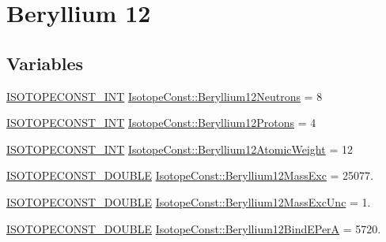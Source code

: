 \hypertarget{group___isotope_const-_beryllium-_be12}{}\section{Beryllium 12}
\label{group___isotope_const-_beryllium-_be12}
\subsection*{Variables}
\begin{DoxyCompactItemize}
\item 
\mbox{\hyperlink{group___isotope_const-_macros_ga5f18360b3e99483a35c32d789e62621c}{I\+S\+O\+T\+O\+P\+E\+C\+O\+N\+S\+T\+\_\+\+I\+NT}} \mbox{\hyperlink{group___isotope_const-_beryllium-_be12_ga2284ea64341a2060eadc0064400bceb4}{Isotope\+Const\+::\+Beryllium12\+Neutrons}} = 8
\item 
\mbox{\hyperlink{group___isotope_const-_macros_ga5f18360b3e99483a35c32d789e62621c}{I\+S\+O\+T\+O\+P\+E\+C\+O\+N\+S\+T\+\_\+\+I\+NT}} \mbox{\hyperlink{group___isotope_const-_beryllium-_be12_gacff3fb429b6ae17c7fd5293fc8c9eb8c}{Isotope\+Const\+::\+Beryllium12\+Protons}} = 4
\item 
\mbox{\hyperlink{group___isotope_const-_macros_ga5f18360b3e99483a35c32d789e62621c}{I\+S\+O\+T\+O\+P\+E\+C\+O\+N\+S\+T\+\_\+\+I\+NT}} \mbox{\hyperlink{group___isotope_const-_beryllium-_be12_ga5ee194a7a8d3c456f05a9bff244ef5b2}{Isotope\+Const\+::\+Beryllium12\+Atomic\+Weight}} = 12
\item 
\mbox{\hyperlink{group___isotope_const-_macros_ga8f45a7272ce02c0b4c65c44636ed719a}{I\+S\+O\+T\+O\+P\+E\+C\+O\+N\+S\+T\+\_\+\+D\+O\+U\+B\+LE}} \mbox{\hyperlink{group___isotope_const-_beryllium-_be12_gaa83b6e00dca8449860c70d8d1275adf3}{Isotope\+Const\+::\+Beryllium12\+Mass\+Exc}} = 25077.
\item 
\mbox{\hyperlink{group___isotope_const-_macros_ga8f45a7272ce02c0b4c65c44636ed719a}{I\+S\+O\+T\+O\+P\+E\+C\+O\+N\+S\+T\+\_\+\+D\+O\+U\+B\+LE}} \mbox{\hyperlink{group___isotope_const-_beryllium-_be12_gab36eee76e5b0fe0da63111addb3c8f2b}{Isotope\+Const\+::\+Beryllium12\+Mass\+Exc\+Unc}} = 1.
\item 
\mbox{\hyperlink{group___isotope_const-_macros_ga8f45a7272ce02c0b4c65c44636ed719a}{I\+S\+O\+T\+O\+P\+E\+C\+O\+N\+S\+T\+\_\+\+D\+O\+U\+B\+LE}} \mbox{\hyperlink{group___isotope_const-_beryllium-_be12_gac60f51b7c67cf8b86a3048637134e96c}{Isotope\+Const\+::\+Beryllium12\+Bind\+E\+PerA}} = 5720.
\item 

\end{DoxyCompactItemize}
